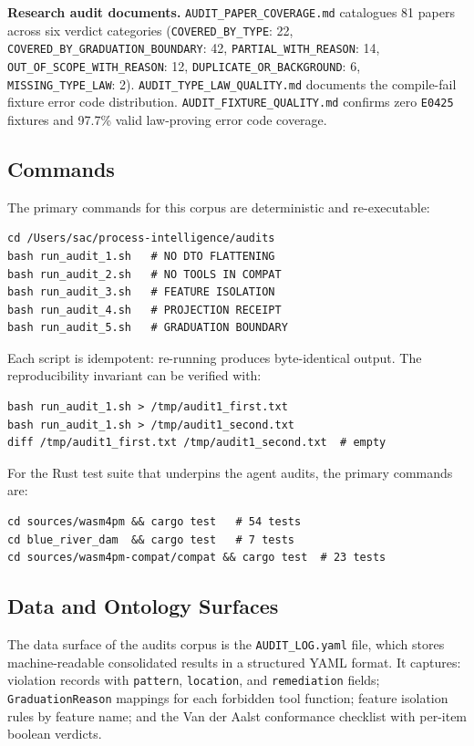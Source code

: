 \textbf{Research audit documents.} \texttt{AUDIT\_PAPER\_COVERAGE.md} catalogues
81 papers across six verdict categories (\texttt{COVERED\_BY\_TYPE}: 22,
\texttt{COVERED\_BY\_GRADUATION\_BOUNDARY}: 42, \texttt{PARTIAL\_WITH\_REASON}:
14, \texttt{OUT\_OF\_SCOPE\_WITH\_REASON}: 12, \texttt{DUPLICATE\_OR\_BACKGROUND}:
6, \texttt{MISSING\_TYPE\_LAW}: 2). \texttt{AUDIT\_TYPE\_LAW\_QUALITY.md}
documents the compile-fail fixture error code distribution. \texttt{AUDIT\_FIXTURE\_QUALITY.md}
confirms zero \texttt{E0425} fixtures and 97.7\% valid law-proving error code
coverage.

\subsection{Commands}
\label{sec:audits-impl-commands}

The primary commands for this corpus are deterministic and re-executable:

\begin{verbatim}
cd /Users/sac/process-intelligence/audits
bash run_audit_1.sh   # NO DTO FLATTENING
bash run_audit_2.sh   # NO TOOLS IN COMPAT
bash run_audit_3.sh   # FEATURE ISOLATION
bash run_audit_4.sh   # PROJECTION RECEIPT
bash run_audit_5.sh   # GRADUATION BOUNDARY
\end{verbatim}

Each script is idempotent: re-running produces byte-identical output. The
reproducibility invariant can be verified with:

\begin{verbatim}
bash run_audit_1.sh > /tmp/audit1_first.txt
bash run_audit_1.sh > /tmp/audit1_second.txt
diff /tmp/audit1_first.txt /tmp/audit1_second.txt  # empty
\end{verbatim}

For the Rust test suite that underpins the agent audits, the primary commands
are:

\begin{verbatim}
cd sources/wasm4pm && cargo test   # 54 tests
cd blue_river_dam  && cargo test   # 7 tests
cd sources/wasm4pm-compat/compat && cargo test  # 23 tests
\end{verbatim}

\subsection{Data and Ontology Surfaces}
\label{sec:audits-impl-data}

The data surface of the audits corpus is the \texttt{AUDIT\_LOG.yaml} file, which
stores machine-readable consolidated results in a structured YAML format. It
captures: violation records with \texttt{pattern}, \texttt{location}, and
\texttt{remediation} fields; \texttt{GraduationReason} mappings for each
forbidden tool function; feature isolation rules by feature name; and the Van der
Aalst conformance checklist with per-item boolean verdicts.

